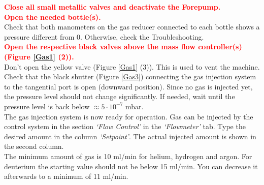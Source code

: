 \documentclass[fleqn,a4paper,20pt]{article}
\begin{document}
\begin{minipage}{.68\textwidth}
\textcolor{red}{\textbf{Close all small metallic valves and deactivate the Forepump.}}\\
		
\textcolor{red}{\textbf{Open the needed bottle(s).}}\\

Check that both manometers on the gas reducer connected to each bottle shows a pressure different from 0. Otherwise, check the Troubleshooting.\\

\textcolor{red}{\textbf{Open the respective black valves above the mass flow controller(s) (Figure \ref{Gas1} (2)).}}\\


Don’t open the yellow valve (Figure \ref{Gas1} (3)). This is used to vent the machine. Check that the black shutter (Figure \ref{Gas3}) connecting the gas injection system to the tangential port is open (downward position). Since no gas is injected yet, the pressure level should not change significantly. If needed, wait until the pressure level is back below  $\approx 5\cdot 10^{-7}$ mbar.\\

The gas injection system is now ready for operation. Gas can be injected by the control system in the section \textit{`Flow Control'} in the \textit{`Flowmeter'} tab. Type the desired amount in the column \textit{`Setpoint'}. The actual injected amount is shown in the second column.\\

The minimum amount of gas is 10 ml/min for helium, hydrogen and argon. For deuterium the starting value should not be below 15 ml/min. You can decrease it afterwards to a minimum of 11 ml/min. 
\end{minipage}
\begin{minipage}{.02\textwidth}
$\ $\\
\end{minipage}
\end{document}
